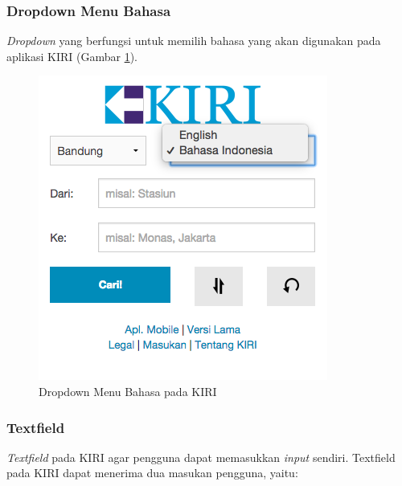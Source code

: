 \subsubsection{Dropdown Menu Bahasa}
\textit{Dropdown} yang berfungsi untuk memilih bahasa yang akan digunakan pada aplikasi KIRI (Gambar \ref{fig:4_KIRI_drop_bahasa}).

\begin{figure}[H]
	\centering
	\includegraphics[scale=0.5]{Gambar/KIRI-drop-bahasa}
	\caption{Dropdown Menu Bahasa pada KIRI} 
	\label{fig:4_KIRI_drop_bahasa}
\end{figure}


\subsubsection{Textfield}
\textit{Textfield} pada KIRI agar pengguna dapat memasukkan \textit{input} sendiri. Textfield pada KIRI dapat menerima dua masukan pengguna, yaitu:


